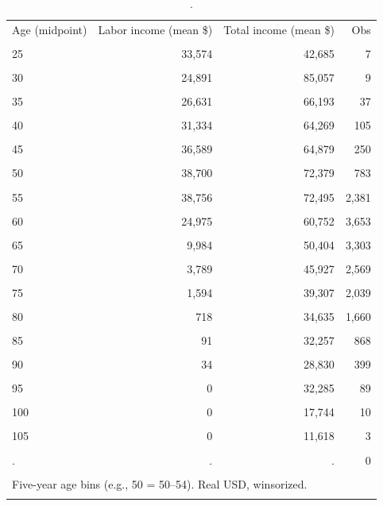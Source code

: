 \begin{table}[htbp]\centering
\caption{.}
\label{tab:income_mean_by_agegroup_2002}
\begin{tabular}{lrrr}\toprule
Age (midpoint) & Labor income (mean \$) & Total income (mean \$) & Obs \\\\ \midrule
25 & 33,574 & 42,685 & 7 \\\\
30 & 24,891 & 85,057 & 9 \\\\
35 & 26,631 & 66,193 & 37 \\\\
40 & 31,334 & 64,269 & 105 \\\\
45 & 36,589 & 64,879 & 250 \\\\
50 & 38,700 & 72,379 & 783 \\\\
55 & 38,756 & 72,495 & 2,381 \\\\
60 & 24,975 & 60,752 & 3,653 \\\\
65 & 9,984 & 50,404 & 3,303 \\\\
70 & 3,789 & 45,927 & 2,569 \\\\
75 & 1,594 & 39,307 & 2,039 \\\\
80 & 718 & 34,635 & 1,660 \\\\
85 & 91 & 32,257 & 868 \\\\
90 & 34 & 28,830 & 399 \\\\
95 & 0 & 32,285 & 89 \\\\
100 & 0 & 17,744 & 10 \\\\
105 & 0 & 11,618 & 3 \\\\
. & . & . & 0 \\\\
\bottomrule
\multicolumn{4}{l}{\footnotesize Five-year age bins (e.g., 50 = 50--54). Real USD, winsorized.} \\\\
\end{tabular}
\end{table}
